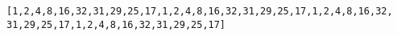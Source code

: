 \begin{verbatim}
[1,2,4,8,16,32,31,29,25,17,1,2,4,8,16,32,31,29,25,17,1,2,4,8,16,32,
31,29,25,17,1,2,4,8,16,32,31,29,25,17]
\end{verbatim}
